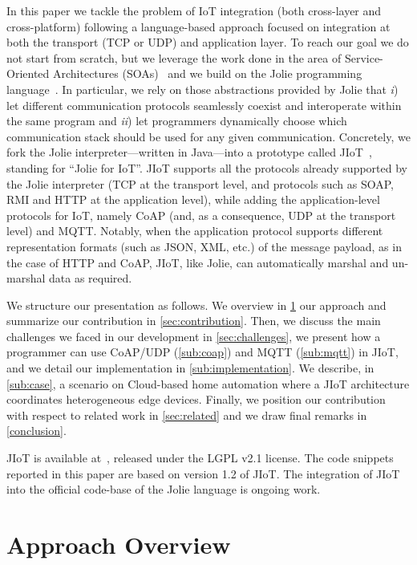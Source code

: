 In this paper we tackle the problem of IoT integration (both cross-layer and
cross-platform) following a language-based approach focused on integration at
both the transport (TCP or UDP) and application layer. To reach our goal we do
not start from scratch, but we leverage the work done in the area of
Service-Oriented Architectures (SOAs)~\cite{Erl07} and we build on the Jolie
programming language~\cite{MONTESI200719,MGZ07,MontesiGZ14,jolie-lang}. In
particular, we rely on those abstractions provided by Jolie that \emph{i}) let
different communication protocols seamlessly coexist and interoperate within the
same program and \emph{ii}) let programmers dynamically choose which
communication stack should be used for any given communication.
%
Concretely, we fork the Jolie interpreter---written in Java---into a prototype
called JIoT~\cite{jiot}, standing for ``Jolie for IoT''.
%
JIoT supports all the protocols already supported by the Jolie interpreter (TCP
at the transport level, and protocols such as SOAP, RMI and HTTP at the
application level), while adding the application-level protocols for IoT, namely
CoAP (and, as a consequence, UDP at the transport level) and MQTT. Notably, when
the application protocol supports different representation formats (such as
JSON, XML, etc.) of the message payload, as in the case of HTTP and CoAP, JIoT,
like Jolie, can automatically marshal and un-marshal data as required.

We structure our presentation as follows. We overview in \cref{sec:approach} our
approach and summarize our contribution in \cref{sec:contribution}. Then, we
discuss the main challenges we faced in our development in
\cref{sec:challenges}, we present how a programmer can use CoAP/UDP
(\cref{sub:coap}) and MQTT (\cref{sub:mqtt}) in JIoT, and we detail our
implementation in \cref{sub:implementation}. We describe, in \cref{sub:case}, a
scenario on Cloud-based home automation where a JIoT architecture coordinates
heterogeneous edge devices. Finally, we position our contribution with respect
to related work in \cref{sec:related} and we draw final remarks in
\cref{conclusion}.

JIoT is available at~\cite{jiot}, released under the LGPL v2.1 license. The code
snippets reported in this paper are based on version 1.2 of JIoT. The
integration of JIoT into the official code-base of the Jolie language is ongoing
work.

\section{Approach Overview}
\label{sec:approach}

